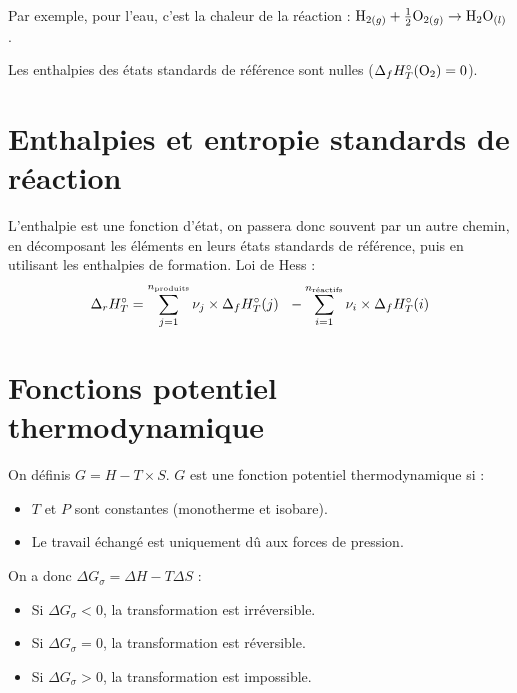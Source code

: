 \documentclass[13pt, twoside, a4paper, french]{report}
\begin{document}
            Par exemple, pour l'eau, c'est la chaleur de la réaction : $\textrm{H}_{2(g)} + \frac{1}{2} \textrm{O}_{2(g)} \rightarrow \textrm{H}_2\textrm{O}_{(l)}$.
            \smallskip

            Les enthalpies des états standards de référence sont nulles ($\Delta_f H^\circ_T(\textrm{O}_2) = 0$).


    \section{Enthalpies et entropie standards de réaction}

        L'enthalpie est une fonction d'état, on passera donc souvent par un autre chemin, en décomposant les éléments en leurs états standards de référence, puis en utilisant les enthalpies de formation.
        Loi de Hess :
        \[\Delta_r H^\circ_T = \sum^{n_\textrm{produits}}_{j=1} \nu_j \times \Delta_f H^\circ_T(j)\ \ - \sum^{n_\textrm{réactifs}}_{i=1} \nu_i \times \Delta_f H^\circ_T(i)\]


    \section{Fonctions potentiel thermodynamique}

        On définis $G = H - T \times S$. $G$ est une fonction potentiel thermodynamique si :
        \begin{itemize}
            \item $T$ et $P$ sont constantes (monotherme et isobare).
            \item Le travail échangé est uniquement dû aux forces de pression.
        \end{itemize}
        On a donc $\Delta G_\sigma = \Delta H - T \Delta S $ :
        \begin{itemize}
            \item Si $\Delta G_\sigma < 0$, la transformation est irréversible.
            \item Si $\Delta G_\sigma = 0$, la transformation est réversible.
            \item Si $\Delta G_\sigma > 0$, la transformation est impossible.
        \end{itemize}
\end{document}
